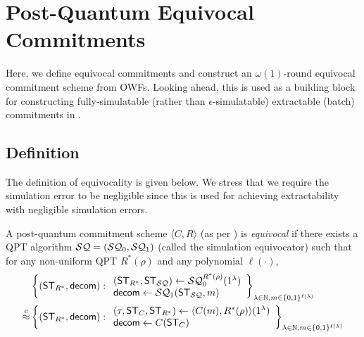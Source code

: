 \section{Post-Quantum Equivocal Commitments} 
Here, we define equivocal commitments and 
construct an $\omega(1)$-round equivocal commitment scheme from OWFs. Looking ahead, this is used as a building block for constructing fully-simulatable (rather than $\epsilon$-simulatable) extractable (batch) commitments in .  

\subsection{Definition}
The definition of equivocality is given below.  
We stress that we require the simulation error to be negligible since this is used for achieving extractability with negligible simulation errors. 
\begin{definition}[PQ-EqCom]\label{def:eqcom}
A post-quantum commitment scheme $\langle C, R\rangle$ (as per ) is {\em equivocal} if there exists a QPT algorithm $\mathcal{SQ}=(\mathcal{SQ}_0,\mathcal{SQ}_1)$ (called the simulation equivocator) such that for any non-uniform QPT $R^*(\rho)$ and any polynomial $\ell(\cdot)$, 
\begin{align*}
   &\left\{
   (\mathsf{ST}_{R^*},\mathsf{decom}):
   \begin{array}{ll}
   (\mathsf{ST}_{R^*},\mathsf{ST}_{\mathcal{SQ}})\gets \mathcal{SQ}_0^{R^*(\rho)}(1^\lambda)\\
   \mathsf{decom}\gets \mathcal{SQ}_1(\mathsf{ST}_{\mathcal{SQ}},m)
   \end{array}
   \right\}_{\lambda\in \mathbb{N},m\in \{0,1\}^{\ell(\lambda)}}\\
   \stackrel{\text{c}}{\approx}
    &\left\{
    (\mathsf{ST}_{R^*},\mathsf{decom}):
    \begin{array}{ll}
    (\tau,\mathsf{ST}_{C},\mathsf{ST}_{R^*})\gets \langle C(m),R^*(\rho) \rangle(1^\lambda)\\
    \mathsf{decom} \gets C(\mathsf{ST}_C)
    \end{array}
    \right\}_{\lambda\in \mathbb{N},m\in \{0,1\}^{\ell(\lambda)}}
\end{align*}
\end{definition} 

